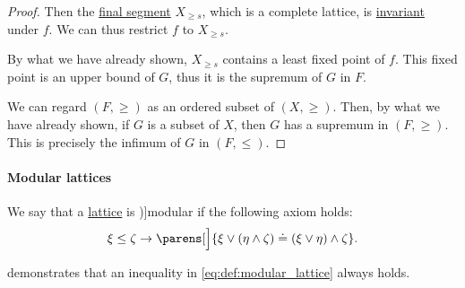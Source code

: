\begin{proof}
  Then the \hyperref[def:order_interval/unbounded]{final segment} \( X_{\geq s} \), which is a complete lattice, is \hyperref[def:invariant_subset]{invariant} under \( f \). We can thus restrict \( f \) to \( X_{\geq s} \).

  By what we have already shown, \( X_{\geq s} \) contains a least fixed point of \( f \). This fixed point is an upper bound of \( G \), thus it is the supremum of \( G \) in \( F \).

   We can regard \( (F, \geq) \) as an ordered subset of \( (X, \geq) \). Then, by what we have already shown, if \( G \) is a subset of \( X \), then \( G \) has a supremum in \( (F, \geq) \). This is precisely the infimum of \( G \) in \( (F, \leq) \).
\end{proof}

\paragraph{Modular lattices}

\begin{definition}\label{def:modular_lattice}
  We say that a \hyperref[def:lattice]{lattice} is \term[ru=модулярная (решётка) (\cite[def. 4.6]{Гуров2013})]{modular} if the following axiom holds:
  \begin{equation}\label{eq:def:modular_lattice}
    \xi \leq \zeta \rightarrow \parens[\Big]{ \xi \vee (\eta \wedge \zeta) \doteq (\xi \vee \eta) \wedge \zeta }.
  \end{equation}
\end{definition}
\begin{comments}
  \item {} demonstrates that an inequality in \eqref{eq:def:modular_lattice} always holds.
\end{comments}

